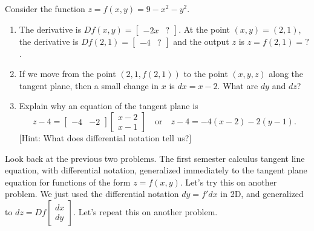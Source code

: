 \begin{problem}\label{tangent plane 9-x^2-y^2}%
%
%
 Consider the function $z=f(x,y)=9-x^2-y^2$. 
\begin{enumerate}
 \item The derivative is $Df(x,y) = \begin{bmatrix}-2x&?\end{bmatrix}$. At the point $(x,y)=(2,1)$, the derivative is $Df(2,1) = \begin{bmatrix}-4&?\end{bmatrix}$ and the output $z$ is $z=f(2,1)=?$.
 \item If we move from the point $(2,1,f(2,1))$ to the point $(x,y,z)$ along the tangent plane, then a small change in $x$ is $dx=x-2$. What are $dy$ and $dz$?
 \item Explain why an equation of the tangent plane is 
$$
z-4=\begin{bmatrix}-4 & -2 \end{bmatrix}\begin{bmatrix}x-2\\x-1\end{bmatrix} 
\quad \text{or}\quad 
z-4=-4(x-2)-2(y-1).$$ [Hint: What does differential notation tell us?]
\end{enumerate}
\end{problem}

Look back at the previous two problems.  The first semester calculus tangent line equation, with differential notation, generalized immediately to the tangent plane equation for functions of the form $z=f(x,y)$. Let's try this on another problem. 
We just used the differential notation $dy=f'dx$ in 2D, and generalized to $dz = Df \begin{bmatrix}dx\\dy\end{bmatrix}$. Let's repeat this on another problem.


